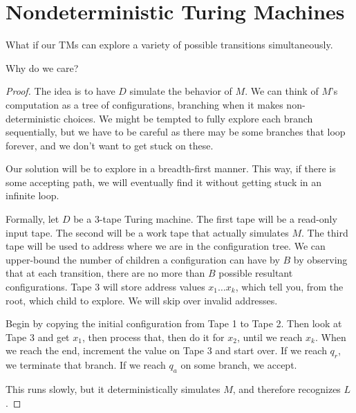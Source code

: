 


\section*{Nondeterministic Turing Machines}

What if our TMs can explore a variety of possible transitions simultaneously.



Why do we care?


\begin{proof}
	
	The idea is to have $D$ simulate the behavior of $M$.  We can think of $M$'s computation as a tree of configurations, branching when it makes non-deterministic choices.  We might be tempted to fully explore each branch sequentially, but we have to be careful as there may be some branches that loop forever, and we don't want to get stuck on these.
	
	Our solution will be to explore in a breadth-first manner.  This way, if there is some accepting path, we will eventually find it without getting stuck in an infinite loop.
	
	Formally, let $D$ be a 3-tape Turing machine.  The first tape will be a read-only input tape.  The second will be a work tape that actually simulates $M$.  The third tape will be used to address where we are in the configuration tree.  We can upper-bound the number of children a configuration can have by $B$ by observing that at each transition, there are no more than $B$ possible resultant configurations.  Tape $3$ will store address values $x_1\dots x_k$, which tell you, from the root, which child to explore.  We will skip over invalid addresses.
	
	Begin by copying the initial configuration from Tape 1 to Tape 2.  Then look at Tape 3 and get $x_1$, then process that, then do it for $x_2$, until we reach $x_k$.  When we reach the end, increment the value on Tape 3 and start over.  If we reach $q_r$, we terminate that branch. If we reach $q_a$ on some branch, we accept. 
	
	This runs slowly, but it deterministically simulates $M$, and therefore recognizes $L$.
	
	
\end{proof}


